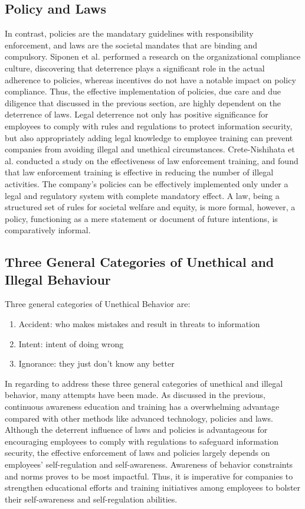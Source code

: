 \documentclass[
10pt, %
a4paper, %
oneside, %
headinclude,footinclude, %
BCOR5mm, %
]{scrartcl}
\begin{document}
\subsection{Policy and Laws}
In contrast, policies are the mandatary guidelines with responsibility enforcement, and laws are the societal mandates that are binding and compulsory.
Siponen et al. performed a research on the organizational compliance culture, discovering that deterrence plays a significant role in the actual adherence to policies, whereas incentives do not have a notable impact on policy compliance.
Thus, the effective implementation of policies, due care and due diligence that discussed in the previous section, are highly dependent on the deterrence of laws.
Legal deterrence not only has positive significance for employees to comply with rules and regulations to protect information security, but also appropriately adding legal knowledge to employee training can prevent companies from avoiding illegal and unethical circumstances.
Crete-Nishihata et al. conducted a study on the effectiveness of law enforcement training, and found that law enforcement training is effective in reducing the number of illegal activities\cite{crete2020information}.
The company's policies can be effectively implemented only under a legal and regulatory system with complete mandatory effect.
A law, being a structured set of rules for societal welfare and equity, is more formal, 
however, a policy, functioning as a mere statement or document of future intentions, is comparatively informal.
\subsection{Three General Categories of Unethical and Illegal Behaviour}
Three general categories of Unethical Behavior are:
\begin{enumerate}[noitemsep]
    \item Accident: who makes mistakes and result in threats to information
    \item Intent: intent of doing wrong
    \item Ignorance: they just don't know any better
\end{enumerate}
In regarding to address these three general categories of unethical and illegal behavior, many attempts have been made.
As discussed in the previous, continuous awareness education and training has a overwhelming advantage compared with other methods like advanced technology, policies and laws.
Although the deterrent influence of laws and policies is advantageous for encouraging employees to comply with regulations to safeguard information security, the effective enforcement of laws and policies largely depends on employees' self-regulation and self-awareness.
Awareness of behavior constraints and norms proves to be most impactful. Thus, it is imperative for companies to strengthen educational efforts and training initiatives among employees to bolster their self-awareness and self-regulation abilities.
\end{document}
